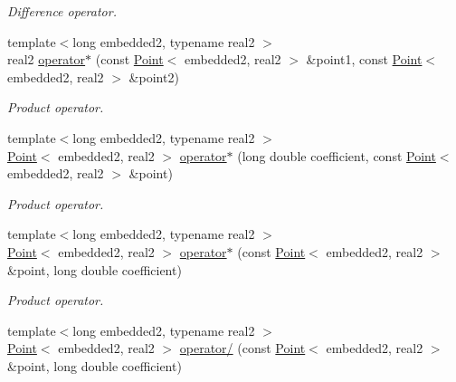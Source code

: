 \begin{DoxyCompactItemize}
\begin{DoxyCompactList}\small\item\em Difference operator. \end{DoxyCompactList}\item 
{\footnotesize template$<$long embedded2, typename real2 $>$ }\\real2 \hyperlink{class_point_afc1da372540656b24f224e7959624c08}{operator$\ast$} (const \hyperlink{class_point}{Point}$<$ embedded2, real2 $>$ \&point1, const \hyperlink{class_point}{Point}$<$ embedded2, real2 $>$ \&point2)\hypertarget{class_point_afc1da372540656b24f224e7959624c08}{}\label{class_point_afc1da372540656b24f224e7959624c08}

\begin{DoxyCompactList}\small\item\em Product operator. \end{DoxyCompactList}\item 
{\footnotesize template$<$long embedded2, typename real2 $>$ }\\\hyperlink{class_point}{Point}$<$ embedded2, real2 $>$ \hyperlink{class_point_acaaff0a0864728144ee00bb8772dfd74}{operator$\ast$} (long double coefficient, const \hyperlink{class_point}{Point}$<$ embedded2, real2 $>$ \&point)\hypertarget{class_point_acaaff0a0864728144ee00bb8772dfd74}{}\label{class_point_acaaff0a0864728144ee00bb8772dfd74}

\begin{DoxyCompactList}\small\item\em Product operator. \end{DoxyCompactList}\item 
{\footnotesize template$<$long embedded2, typename real2 $>$ }\\\hyperlink{class_point}{Point}$<$ embedded2, real2 $>$ \hyperlink{class_point_ab2682a3fd01359b9a694b8f8494341e1}{operator$\ast$} (const \hyperlink{class_point}{Point}$<$ embedded2, real2 $>$ \&point, long double coefficient)\hypertarget{class_point_ab2682a3fd01359b9a694b8f8494341e1}{}\label{class_point_ab2682a3fd01359b9a694b8f8494341e1}

\begin{DoxyCompactList}\small\item\em Product operator. \end{DoxyCompactList}\item 
{\footnotesize template$<$long embedded2, typename real2 $>$ }\\\hyperlink{class_point}{Point}$<$ embedded2, real2 $>$ \hyperlink{class_point_a587faaadac82c79e9119d8bc59396c79}{operator/} (const \hyperlink{class_point}{Point}$<$ embedded2, real2 $>$ \&point, long double coefficient)\hypertarget{class_point_a587faaadac82c79e9119d8bc59396c79}{}\label{class_point_a587faaadac82c79e9119d8bc59396c79}


\end{DoxyCompactItemize}
